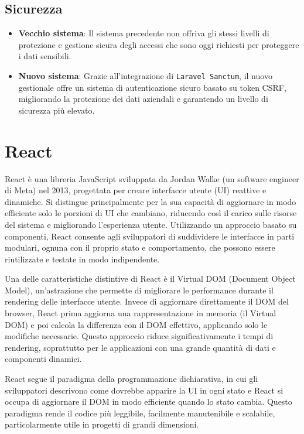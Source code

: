 \subsection{Sicurezza}

\begin{itemize}
    \item \textbf{Vecchio sistema}: Il sistema precedente non offriva gli stessi livelli di protezione e gestione sicura degli accessi che sono oggi richiesti per proteggere i dati sensibili.
    \item \textbf{Nuovo sistema}: Grazie all’integrazione di \texttt{Laravel Sanctum}, il nuovo gestionale offre un sistema di autenticazione sicuro basato su token CSRF, migliorando la protezione dei dati aziendali e garantendo un livello di sicurezza più elevato.
\end{itemize}

\section{React}\label{sec:cap_sec_subsec_react}
React è una libreria JavaScript sviluppata da Jordan Walke (un software engineer di Meta) nel 2013, progettata per creare interfacce utente (UI) reattive e dinamiche. Si distingue principalmente per la sua capacità di aggiornare in modo efficiente solo le porzioni di UI che cambiano, riducendo così il carico sulle risorse del sistema e migliorando l'esperienza utente. Utilizzando un approccio basato su componenti, React consente agli sviluppatori di suddividere le interfacce in parti modulari, ognuna con il proprio stato e comportamento, che possono essere riutilizzate e testate in modo indipendente.

Una delle caratteristiche distintive di React è il Virtual DOM (Document Object Model), un'astrazione che permette di migliorare le performance durante il rendering delle interfacce utente. Invece di aggiornare direttamente il DOM del browser, React prima aggiorna una rappresentazione in memoria (il Virtual DOM) e poi calcola la differenza con il DOM effettivo, applicando solo le modifiche necessarie. Questo approccio riduce significativamente i tempi di rendering, soprattutto per le applicazioni con una grande quantità di dati e componenti dinamici.

React segue il paradigma della programmazione dichiarativa, in cui gli sviluppatori descrivono come dovrebbe apparire la UI in ogni stato e React si occupa di aggiornare il DOM in modo efficiente quando lo stato cambia. Questo paradigma rende il codice più leggibile, facilmente manutenibile e scalabile, particolarmente utile in progetti di grandi dimensioni.

